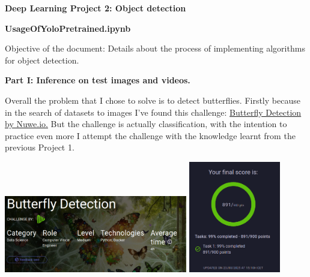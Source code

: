 \documentclass{cpsc202}
\begin{document}
    \centerline{\Large\textbf{Deep Learning Project 2: Object detection}}
    \Large\textbf{UsageOfYoloPretrained.ipynb}

    Objective of the document: Details about the process of implementing algorithms for object detection.

    \large\textbf{Part I: Inference on test images and videos.}

    Overall the problem that I chose to solve is to detect butterflies.
    Firstly because in the search of datasets to images I've found this challenge: \href{https://nuwe.io/coding-challenges/nuwe-data-science-dl2}{Butterfly Detection by Nuwe.io.}
    But the challenge is actually classification, with the intention to practice even more I attempt the challenge with the knowledge learnt from the previous Project 1.
    \begin{center}
        \includegraphics[width=0.6\textwidth]{challenge_butterfly_classification}
        \includegraphics[width=0.3\textwidth]{challenge_result}
    \end{center}
\end{document}
